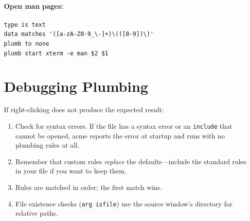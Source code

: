 \paragraph{Open man pages:}
\begin{lstlisting}[frame=none,basicstyle=\small\ttfamily]
type is text
data matches '([a-zA-Z0-9_\-]+)\(([0-9])\)'
plumb to none
plumb start xterm -e man $2 $1
\end{lstlisting}

\section{Debugging Plumbing}

If right-clicking does not produce the expected result:

\begin{enumerate}
\item Check  for syntax errors.
      If the file has a syntax error or an \texttt{include} that cannot be
      opened, acme reports the error at startup and runs with no plumbing
      rules at all.
\item Remember that custom rules \emph{replace} the defaults---include
      the standard rules in your file if you want to keep them.
\item Rules are matched in order; the first match wins.
\item File existence checks (\texttt{arg isfile}) use the source
      window's directory for relative paths.
\end{enumerate}
